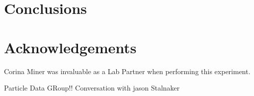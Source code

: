 \documentclass[11pt,letterpaper]{article}
\begin{document}
\section{Conclusions}
\section{Acknowledgements}
Corina Miner was invaluable as a Lab Partner when performing this experiment.

\begin{thebibliography}{99}
  Particle Data GRoup!!
 Conversation with jason Stalnaker



\end{thebibliography}
\end{document}
